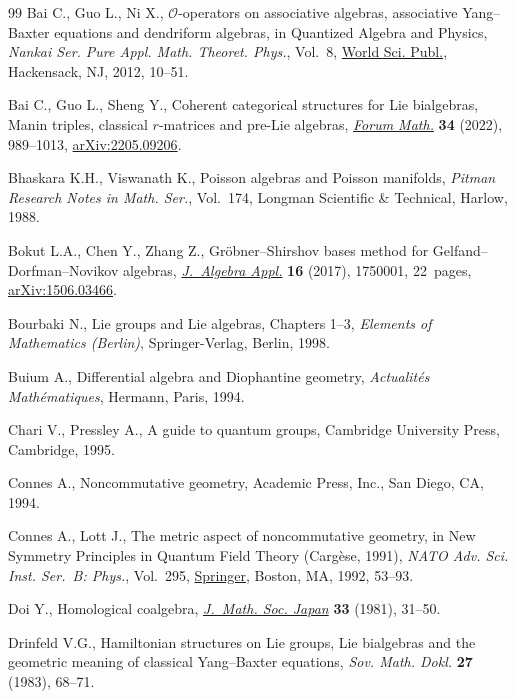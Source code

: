 \documentclass[10pt,a4paper]{amsart}
\numberwithin{equation}{section}
\begin{document}
\begin{thebibliography}{99}
Bai C., Guo L., Ni X., {$\mathcal{O}$}-operators on associative algebras,
 associative {Y}ang--{B}axter equations and dendriform algebras, in Quantized
 Algebra and Physics, \textit{Nankai Ser. Pure Appl. Math. Theoret. Phys.},
 Vol.~8, \href{https://doi.org/10.1142/9789814340458_0002}{World Sci. Publ.}, Hackensack, NJ, 2012, 10--51.

Bai C., Guo L., Sheng Y., Coherent categorical structures for {L}ie bialgebras,
 {M}anin triples, classical {$r$}-matrices and pre-{L}ie algebras,
 \href{https://doi.org/10.1515/forum-2021-0240}{\textit{Forum Math.}} \textbf{34} (2022), 989--1013, \href{https://arxiv.org/abs/2205.09206}{arXiv:2205.09206}.

Bhaskara K.H., Viswanath K., Poisson algebras and {P}oisson manifolds,
 \textit{Pitman Research Notes in Math. Ser.}, Vol.~174, Longman Scientific \&
 Technical, Harlow, 1988.

Bokut L.A., Chen Y., Zhang Z., Gr\"obner--{S}hirshov bases method for
 {G}elfand--{D}orfman--{N}ovikov algebras, \href{https://doi.org/10.1142/S0219498817500013}{\textit{J.~Algebra Appl.}}
 \textbf{16} (2017), 1750001, 22~pages, \href{https://arxiv.org/abs/1506.03466}{arXiv:1506.03466}.

Bourbaki N., Lie groups and {L}ie algebras, {C}hapters 1--3, \textit{Elements of
 Mathematics (Berlin)}, Springer-Verlag, Berlin, 1998.

Buium A., Differential algebra and {D}iophantine geometry, \textit{Actualit\'es
 Math\'ematiques}, Hermann, Paris, 1994.

Chari V., Pressley A., A guide to quantum groups, Cambridge University Press,
 Cambridge, 1995.

Connes A., Noncommutative geometry, Academic Press, Inc., San Diego, CA, 1994.

Connes A., Lott J., The metric aspect of noncommutative geometry, in New
 Symmetry Principles in Quantum Field Theory ({C}arg\`ese, 1991), \textit{NATO
 Adv. Sci. Inst. Ser.~B: Phys.}, Vol.~295, \href{https://doi.org/10.1007/978-1-4615-3472-3_3}{Springer}, Boston, MA, 1992, 53--93.

Doi Y., Homological coalgebra, \href{https://doi.org/10.2969/jmsj/03310031}{\textit{J.~Math. Soc. Japan}} \textbf{33} (1981),
 31--50.

Drinfeld V.G., Hamiltonian structures on {L}ie groups, {L}ie bialgebras and the
 geometric meaning of classical {Y}ang--{B}axter equations, \textit{Sov. Math.
 Dokl.} \textbf{27} (1983), 68--71.


\end{thebibliography}
\end{document}
